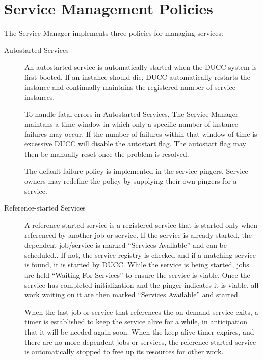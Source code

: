       \section{Service Management Policies}

      The Service Manager implements three policies for managing services:
      \begin{description}

         \item[Autostarted Services] An autostarted service is automatically started when the DUCC
           system is first booted.  If an instance should die, DUCC automatically restarts the
           instance and continually maintains the registered number of service instances.

           To handle fatal errors in Autostarted Services, The Service Manager maintans a time
           window in which only a specific number of instance failures may occur.  If the number of
           failures within that window of time is excessive DUCC will disable the autostart flag.
           The autostart flag may then be manually reset once the problem is resolved.

           The default failure policy is implemented in the service pingers. Service
           owners may redefine the policy by supplying their own pingers for a service.
          
         \item[Reference-started Services] A reference-started service is a registered service that
           is started only when referenced by another job or service. If the service is already
           started, the dependent job/service is marked ``Services Available'' and can be scheduled.. If
           not, the service registry is checked and if a matching service is found, it is 
           started by DUCC.  While the service is being started, jobs are held ``Waiting For Services''
           to ensure the service is viable. Once the service has completed initialization and the pinger 
           indicates it is viable, all work waiting on it are then marked ``Services Available'' and
           started.  
          
           When the last job or service that references the on-demand service exits, a timer is
           established to keep the service alive for a while, in anticipation that it will be needed
           again soon.  When the keep-alive timer expires, and there are no more dependent jobs or
           services, the reference-started service is automatically stopped to free up its resources
           for other work.


\end{description}
